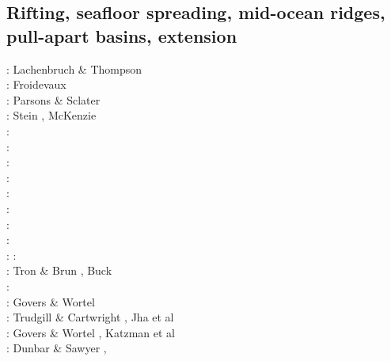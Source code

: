 \subsection{Rifting, seafloor spreading, mid-ocean ridges, pull-apart basins, extension}

\begin{scriptsize}
\nineteenseventytwo: Lachenbruch \& Thompson \cite{lath72}\\
\nineteenseventythree: Froidevaux \cite{froi73}\\
\nineteenseventyseven: Parsons \& Sclater \cite{pasc77}\\
\nineteenseventyeight: Stein \cite{stei78}, McKenzie \cite{mcke78}\\
\nineteeneighty: \cite{bran80}\\
\nineteeneightytwo: \cite{bekb82}\\
\nineteeneightythree: \cite{engl83}\\
\nineteeneightyfour: \cite{poay84}\\
\nineteeneightyfive: \cite{bosw85}\\
\nineteeneightysix: \cite{hoen86b}\cite{zupf86}\cite{zupa86}\cite{mofr86}\cite{mcke86}\cite{buck86}\\
\nineteeneightyseven: \cite{spmc87}\\
\nineteeneightyeight: \cite{bums88}\\
\nineteeneightynine: \cite{mewi89}\cite{brbe89}\cite{ismb89}\cite{soen89}\cite{brbe89b}\cite{brbe89c}
\nineteenninety: \cite{fara90}\cite{lipa90}\cite{mccl90}\cite{chmo90}\cite{chmo90b}\\
\nineteenninetyone: Tron \& Brun \cite{trbr91}, Buck \cite{buck91}\\
\nineteenninetytwo: \cite{zieg92b}\cite{egan92}\\
\nineteenninetythree: Govers \& Wortel \cite{gowo93}\\
\nineteenninetyfour: Trudgill \& Cartwright \cite{trca94}, Jha et al \cite{jhpp94}\\
\nineteenninetyfive: Govers \& Wortel \cite{gowo95}, Katzman et al \cite{katl95}\\
\nineteenninetysix: Dunbar \& Sawyer \cite{dusa96}, \cite{beda96}\cite{mada96}\\

\end{scriptsize}
